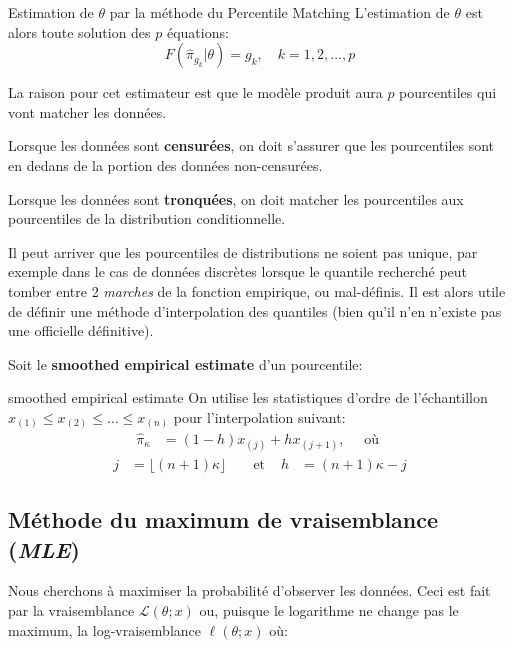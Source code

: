 \documentclass[10pt, french]{article}
\begin{document}
\begin{multicols*}{3}
\begin{algo}{Estimation de $\theta$ par la méthode du \guillemotleft Percentile Matching \guillemotright}
L'estimation de $\theta$ est alors toute solution des $p$ équations:
\begin{equation*}
	F(\hat\pi_{g_{k}} | \theta)	=	g_{k}, \quad	k = 1, 2, \dots, p
\end{equation*}
\end{algo}

La raison pour cet estimateur est que le modèle produit aura $p$ pourcentiles qui vont \guillemotleft matcher \guillemotright les données.

Lorsque les données sont \textbf{censurées}, on doit s'assurer que les pourcentiles sont en dedans de la portion des données non-censurées.

Lorsque les données sont \textbf{tronquées}, on doit \guillemotleft matcher \guillemotright les pourcentiles aux pourcentiles de la distribution conditionnelle.

Il peut arriver que les pourcentiles de distributions ne soient pas unique, par exemple dans le cas de données discrètes lorsque le quantile recherché peut tomber entre 2 \emph{marches} de la fonction empirique, ou mal-définis.
Il est alors utile de définir une méthode d'interpolation des quantiles (bien qu'il n'en n'existe pas une officielle définitive).

Soit le \guillemotleft \textbf{smoothed empirical estimate} \guillemotright d'un pourcentile:

\begin{algo}{\guillemotleft smoothed empirical estimate \guillemotright}
On utilise les statistiques d'ordre de l'échantillon $x_{(1)} \le x_{(2)} \le \dots \le x_{(n)}$ pour l'interpolation suivant:
\begin{align*}
	\hat\pi_{\kappa}
	&=	(1 - h)x_{(j)} + h x_{(j + 1)}, \quad \text{ où }	
\end{align*}
\begin{align*}
	j
	&=	\lfloor (n + 1) \kappa \rfloor	&
	&\text{ et }	&
	h
	&=	(n + 1) \kappa - j
\end{align*}
\end{algo}


\subsection*{Méthode du maximum de vraisemblance (\emph{MLE})}

Nous cherchons à maximiser la probabilité d'observer les données.
Ceci est fait par la vraisemblance $\mathcal{L}(\theta; x)$ ou, puisque le logarithme ne change pas le maximum, la log-vraisemblance $\ell(\theta; x)$ où:


\end{multicols*}
\end{document}
